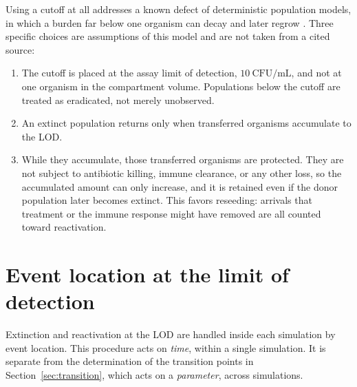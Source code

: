 \documentclass[11pt]{article}
\begin{document}
Using a cutoff at all addresses a known defect of deterministic population
models, in which a burden far below one organism can decay and later regrow
\cite{Mollison1991,CampilloLobry2012}.
Three specific choices are assumptions of this model and are not taken from a
cited source:
\begin{enumerate}
\item The cutoff is placed at the assay limit of detection,
$10~\mathrm{CFU/mL}$, and not at one organism in the compartment volume.
Populations below the cutoff are treated as eradicated, not merely
unobserved.
\item An extinct population returns only when transferred organisms
accumulate to the LOD.
\item While they accumulate, those transferred organisms are protected. They
are not subject to antibiotic killing, immune clearance, or any other loss, so
the accumulated amount can only increase, and it is retained even if the donor
population later becomes extinct. This favors reseeding: arrivals that
treatment or the immune response might have removed are all counted toward
reactivation.
\end{enumerate}

\section{Event location at the limit of detection}
\label{sec:event-location}

Extinction and reactivation at the LOD are handled inside each simulation by
event location. This procedure acts on \emph{time}, within a single
simulation. It is separate from the determination of the transition points
in Section~\ref{sec:transition}, which acts on a \emph{parameter}, across
simulations.
\end{document}
